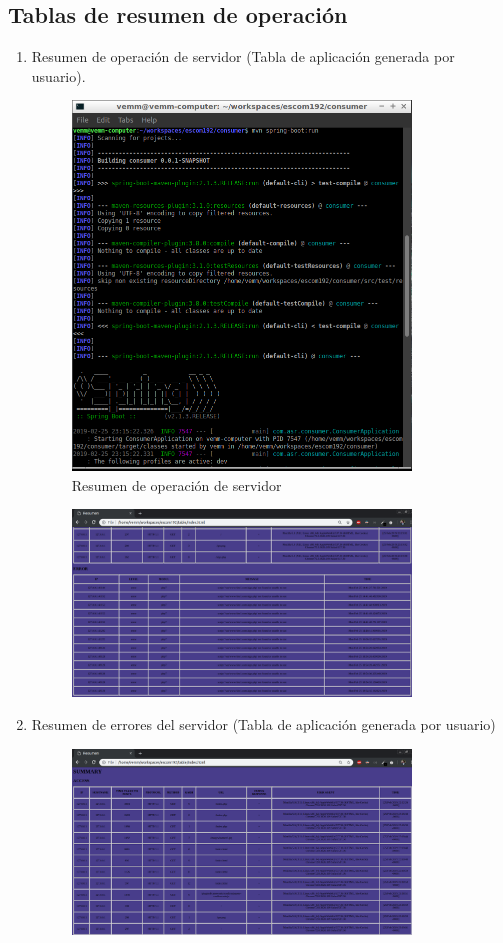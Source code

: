 \subsection{Tablas de resumen de operación}
	\begin{enumerate}
		\item Resumen de operación de servidor (Tabla de aplicación generada por usuario).
			\begin{figure}[htbp]
				\centering
				\includegraphics[width=9cm]{./img/lista/19.png}
				\caption[Resumen de operación de servidor]{Resumen de operación de servidor}
				\label{fig:19}
			\end{figure}
			\begin{figure}[htbp]
			\centering
				\includegraphics[width=9cm]{./img/lista/19_1.png}
				\label{fig:19.1}
			\end{figure}
		\item Resumen de errores del servidor (Tabla de aplicación generada por usuario)
			\begin{figure}[htbp]
				\centering
				\includegraphics[width=9cm]{./img/lista/20.png}

\end{figure}
\end{enumerate}
